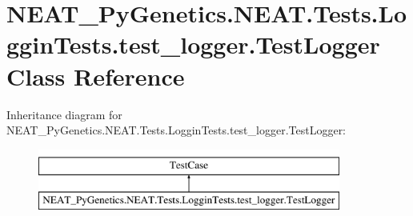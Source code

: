 \hypertarget{classNEAT__PyGenetics_1_1NEAT_1_1Tests_1_1LogginTests_1_1test__logger_1_1TestLogger}{}\section{N\+E\+A\+T\+\_\+\+Py\+Genetics.\+N\+E\+A\+T.\+Tests.\+Loggin\+Tests.\+test\+\_\+logger.\+Test\+Logger Class Reference}
\label{classNEAT__PyGenetics_1_1NEAT_1_1Tests_1_1LogginTests_1_1test__logger_1_1TestLogger}
Inheritance diagram for N\+E\+A\+T\+\_\+\+Py\+Genetics.\+N\+E\+A\+T.\+Tests.\+Loggin\+Tests.\+test\+\_\+logger.\+Test\+Logger\+:\begin{figure}[H]
\begin{center}
\leavevmode
\includegraphics[height=2.000000cm]{classNEAT__PyGenetics_1_1NEAT_1_1Tests_1_1LogginTests_1_1test__logger_1_1TestLogger}
\end{center}
\end{figure}
